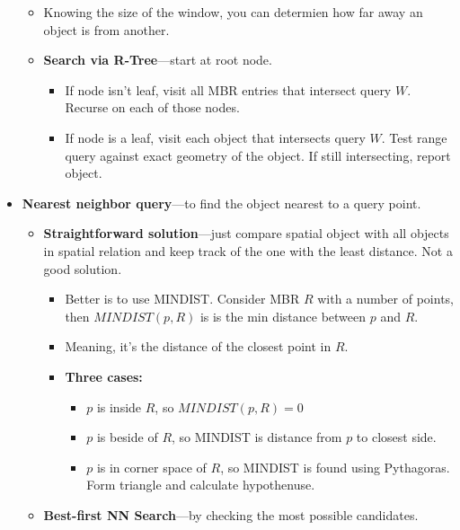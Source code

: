 \begin{multicols}{2}
\begin{itemize}
  \begin{itemize}
    \item
    Knowing the size of the window, you can determien how far away an
    object is from another.
  \item
    \textbf{Search via R-Tree}---start at root node.

    \begin{itemize}
        \item
      If node isn't leaf, visit all MBR entries that intersect query
      \(W\). Recurse on each of those nodes.
    \item
      If node is a leaf, visit each object that intersects query \(W\).
      Test range query against exact geometry of the object. If still
      intersecting, report object.
    \end{itemize}
  \end{itemize}
\item
  \textbf{Nearest neighbor query}---to find the object nearest to a
  query point.

  \begin{itemize}
    \item
    \textbf{Straightforward solution}---just compare spatial object with
    all objects in spatial relation and keep track of the one with the
    least distance. Not a good solution.

    \begin{itemize}
        \item
      Better is to use MINDIST. Consider MBR \(R\) with a number of
      points, then \(MINDIST(p, R)\) is is the min distance between
      \(p\) and \(R\).
    \item
      Meaning, it's the distance of the closest point in \(R\).
    \item
      \textbf{Three cases:}

      \begin{itemize}
            \item
        \(p\) is inside \(R\), so \(MINDIST(p,R)=0\)
      \item
        \(p\) is beside of \(R\), so MINDIST is distance from \(p\) to
        closest side.
      \item
        \(p\) is in corner space of \(R\), so MINDIST is found using
        Pythagoras. Form triangle and calculate hypothenuse.
      \end{itemize}
    \end{itemize}
  \item
    \textbf{Best-first NN Search}---by checking the most possible
    candidates.


\end{itemize}
\end{itemize}
\end{multicols}
